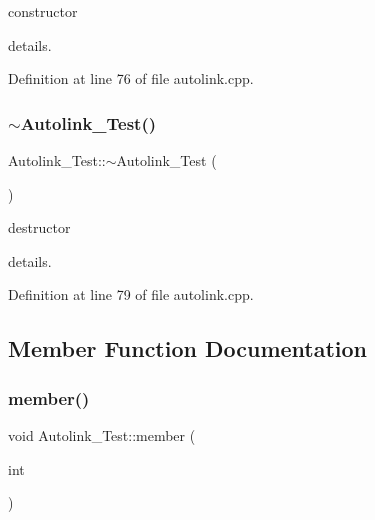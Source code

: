 constructor 

details. 

Definition at line 76 of file autolink.\+cpp.


\begin{DoxyCode}{0}

\end{DoxyCode}
\mbox{\label{class_autolink___test_a03bf46c8e2b733680035f524fd7b193b}} 
\subsubsection{\texorpdfstring{$\sim$Autolink\_Test()}{~Autolink\_Test()}}
{\footnotesize\ttfamily Autolink\+\_\+\+Test\+::$\sim$\+Autolink\+\_\+\+Test (\begin{DoxyParamCaption}{ }\end{DoxyParamCaption})}



destructor 

details. 

Definition at line 79 of file autolink.\+cpp.


\begin{DoxyCode}{0}

\end{DoxyCode}


\subsection{Member Function Documentation}
\mbox{\label{class_autolink___test_a393ea281f235a2f603d98daf72b0d411}} 
\subsubsection{\texorpdfstring{member()}{member()}\hspace{0.1cm}{\footnotesize\ttfamily [1/2]}}
{\footnotesize\ttfamily void Autolink\+\_\+\+Test\+::member (\begin{DoxyParamCaption}\item[{int}]{ }\end{DoxyParamCaption})}



